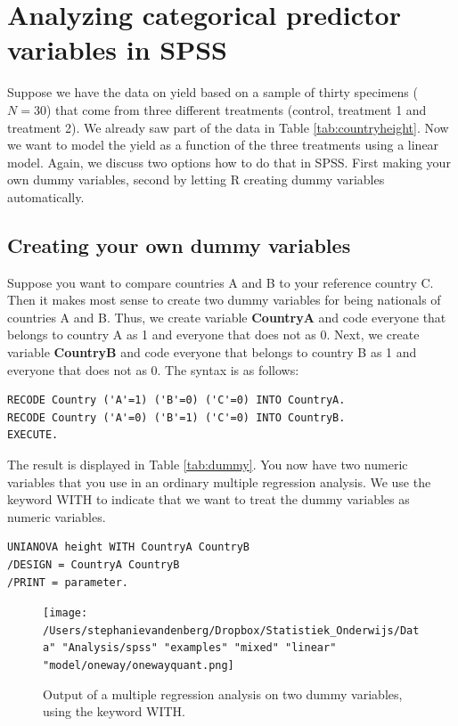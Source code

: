 \documentclass[]{book}\usepackage[]{graphicx}\usepackage[]{color}
\begin{document}
\section{Analyzing categorical predictor variables in SPSS}

Suppose we have the data on yield based on a sample of thirty specimens ($N=30$) that come from three different treatments (control, treatment 1 and treatment 2). We already saw part of the data in Table \ref{tab:countryheight}. Now we want to model the yield as a function of the three treatments using a linear model. Again, we discuss two options how to do that in SPSS. First making your own dummy variables, second by letting R creating dummy variables automatically. 

\subsection{Creating your own dummy variables}

Suppose you want to compare countries A and B to your reference country C. Then it makes most sense to create two dummy variables for being nationals of countries A and B. Thus, we create variable \textbf{CountryA} and code everyone that belongs to country A as 1 and everyone that does not as 0. Next, we create variable \textbf{CountryB} and code everyone that belongs to country B as 1 and everyone that does not as 0. The syntax is as follows:



\begin{verbatim}
RECODE Country ('A'=1) ('B'=0) ('C'=0) INTO CountryA.
RECODE Country ('A'=0) ('B'=1) ('C'=0) INTO CountryB.
EXECUTE.
\end{verbatim}

The result is displayed in Table \ref{tab:dummy}. You now have two numeric variables that you use in an ordinary multiple regression analysis. We use the keyword WITH to indicate that we want to treat the dummy variables as numeric variables.

\begin{verbatim}
UNIANOVA height WITH CountryA CountryB
/DESIGN = CountryA CountryB
/PRINT = parameter.
\end{verbatim}

\begin{figure}[h]
    \begin{center}
       \texttt{[image: /Users/stephanievandenberg/Dropbox/Statistiek\_Onderwijs/Data" "Analysis/spss" "examples" "mixed" "linear" "model/oneway/onewayquant.png]}
    \end{center}
    \caption{Output of a multiple regression analysis on two dummy variables, using the keyword WITH.}
    \label{fig:dummy_21}
\end{figure}
\end{document}
